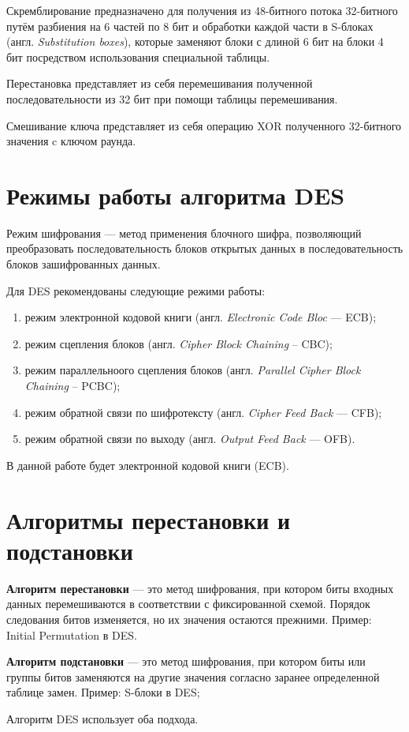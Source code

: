 Скремблирование предназначено для получения из 48-битного потока 32-битного путём разбиения на 6 частей по 8 бит и обработки каждой части в S-блоках (англ. \textit{Substitution boxes}), которые заменяют блоки с длиной 6 бит на блоки 4 бит посредством использования специальной таблицы.

Перестановка представляет из себя перемешивания полученной последовательности из 32 бит при помощи таблицы перемешивания.

Смешивание ключа представляет из себя операцию XOR полученного 32-битного значения c ключом раунда.


\section{Режимы работы алгоритма DES}

Режим шифрования --- метод применения блочного шифра, позволяющий преобразовать последовательность блоков открытых данных в последовательность блоков зашифрованных данных.

Для DES рекомендованы следующие режими работы:
\begin{enumerate}[label=\arabic*)]
	\item режим электронной кодовой книги (англ. \textit{Electronic Code Bloc} --- ECB);
	\item режим сцепления блоков (англ. \textit{Cipher Block Chaining} -- CBC);
	\item режим параллельноого сцепления блоков (англ. \textit{Parallel Cipher Block Chaining} -- PCBC);
	\item режим обратной связи по шифротексту (англ. \textit{Cipher Feed Back} --- CFB);
	\item режим обратной связи по выходу (англ. \textit{Output Feed Back} --- OFB).
\end{enumerate}

В данной работе будет электронной кодовой книги (ECB).

\section{Алгоритмы перестановки и подстановки}

\textbf{Алгоритм перестановки} --- это метод шифрования, при котором биты входных данных перемешиваются в соответствии с фиксированной схемой. Порядок следования битов изменяется, но их значения остаются прежними. Пример: Initial Permutation в DES.

\textbf{Алгоритм подстановки} --- это метод шифрования, при котором биты или группы битов заменяются на другие значения согласно заранее определенной таблице замен. Пример: S-блоки в DES;

Алгоритм DES использует оба подхода.
